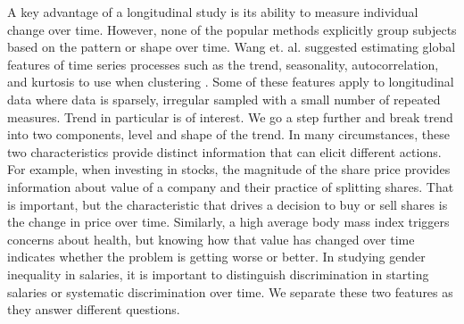 A key advantage of a longitudinal study is its ability to measure individual change over time. However, none of the popular methods explicitly group subjects based on the pattern or shape over time. Wang et. al. suggested estimating global features of time series processes such as the trend, seasonality, autocorrelation, and kurtosis to use when clustering \cite{wang2006}. Some of these features apply to longitudinal data where data is sparsely, irregular sampled with a small number of repeated measures. Trend in particular is of interest. We go a step further and break trend into two components, level and shape of the trend. In many circumstances, these two characteristics provide distinct information that can elicit different actions. For example, when investing in stocks, the magnitude of the share price provides information about value of a company and their practice of splitting shares. That is important, but the characteristic that drives a decision to buy or sell shares is the change in price over time. Similarly, a high average body mass index triggers concerns about health, but knowing how that value has changed over time indicates whether the problem is getting worse or better. In studying gender inequality in salaries, it is important to distinguish discrimination in starting salaries or systematic discrimination over time. We separate these two features as they answer different questions. 


